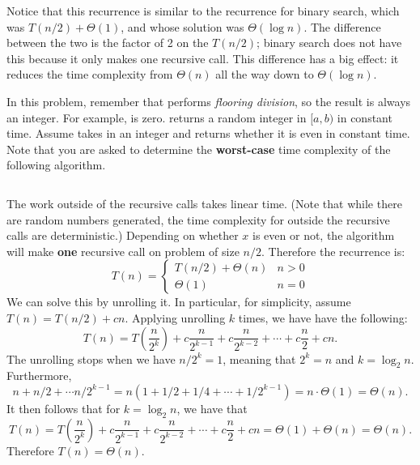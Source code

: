\begin{prob}
\begin{subprobset}
\begin{subprob}
\begin{soln}
                Notice that this recurrence is similar to the recurrence for
                binary search, which was $T(n/2) + \Theta(1)$, and whose solution was
                $\Theta(\log n)$. The difference between the two is the factor
                of 2 on the $T(n/2)$; binary search does not have this because it only
                makes one recursive call. This difference has a big effect: it reduces
                the time complexity from $\Theta(n)$ all the way down to $\Theta(\log n)$.

            \end{soln}
        \end{subprob}

        \begin{subprob}
            In this problem, remember that \python{//} performs \emph{flooring division},
            so the result is always an integer. For example,  is zero.
             returns a random integer in $[a,b)$ in constant time. 
            Assume  takes in an integer and returns whether it is even
            in constant time. Note that you are asked to determine the {\bf worst-case} time complexity of the following algorithm. 

            \inputminted{python}{\thisdir/include/part_c.py}

            \begin{soln}
                The work outside of the recursive calls takes linear time. (Note that while there are random numbers generated, the time complexity for outside the recursive calls are deterministic.) 
                Depending on whether $x$ is even or not, the algorithm will make {\bf one} recursive call on problem of size $n/2$. Therefore the recurrence is: 
                \[
                T(n) = \begin{cases} 
                    T(n/2) + \Theta(n) & n > 0 \\
                    \Theta(1) & n = 0
                 \end{cases}
                \]
                We can solve this by unrolling it. In particular, for simplicity, assume $T(n) = T(n/2) + cn$. 
                Applying unrolling $k$ times, we have have the following: 
                \[ T(n) = T(\frac{n}{2^{k}}) + c \frac{n}{2^{k-1}} + c\frac{n}{2^{k-2}} + \cdots + c\frac{n}{2} + cn . \]
                The unrolling stops when we have $n / 2^k = 1$, meaning that $2^k = n$ and $k=\log_2 n$. Furthermore,  
                \[ n + n/2 + \cdots n/ 2^{k-1} = n (1 + 1/2 + 1/4 + \cdots + 1/2^{k-1}) = n \cdot \Theta(1) = \Theta(n).\]
                It then follows that for $k = \log_2 n$, we have that 
                \[T(n) = T(\frac{n}{2^{k}}) + c \frac{n}{2^{k-1}} + c\frac{n}{2^{k-2}} + \cdots + c\frac{n}{2} + cn = \Theta(1) + \Theta(n) = \Theta(n).\]
                Therefore $T(n) = \Theta(n)$. 
              

\end{soln}
\end{subprob}
\end{subprobset}
\end{prob}
